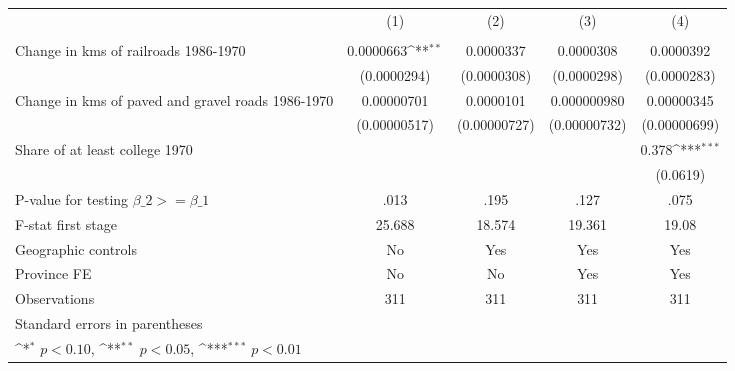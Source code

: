 {
\def\sym#1{\ifmmode^{#1}\else\(^{#1}\)\fi}
\begin{tabular}{l*{4}{c}}
\hline\hline
                &\multicolumn{1}{c}{(1)}&\multicolumn{1}{c}{(2)}&\multicolumn{1}{c}{(3)}&\multicolumn{1}{c}{(4)}\\
                &\multicolumn{1}{c}{}&\multicolumn{1}{c}{}&\multicolumn{1}{c}{}&\multicolumn{1}{c}{}\\
\hline
Change in kms of railroads 1986-1970&0.0000663\sym{**} &0.0000337         &0.0000308         &0.0000392         \\
                &(0.0000294)         &(0.0000308)         &(0.0000298)         &(0.0000283)         \\
[1em]
Change in kms of paved and gravel roads 1986-1970&0.00000701         &0.0000101         &0.000000980         &0.00000345         \\
                &(0.00000517)         &(0.00000727)         &(0.00000732)         &(0.00000699)         \\
[1em]
Share of at least college 1970&                  &                  &                  &    0.378\sym{***}\\
                &                  &                  &                  & (0.0619)         \\
\hline
P-value for testing $\beta\_{2} >= \beta\_{1}$&     .013         &     .195         &     .127         &     .075         \\
F-stat first stage&   25.688         &   18.574         &   19.361         &    19.08         \\
Geographic controls&       No         &      Yes         &      Yes         &      Yes         \\
Province FE     &       No         &       No         &      Yes         &      Yes         \\
Observations    &      311         &      311         &      311         &      311         \\
\hline\hline
\multicolumn{5}{l}{\footnotesize Standard errors in parentheses}\\
\multicolumn{5}{l}{\footnotesize \sym{*} \(p<0.10\), \sym{**} \(p<0.05\), \sym{***} \(p<0.01\)}\\
\end{tabular}
}
